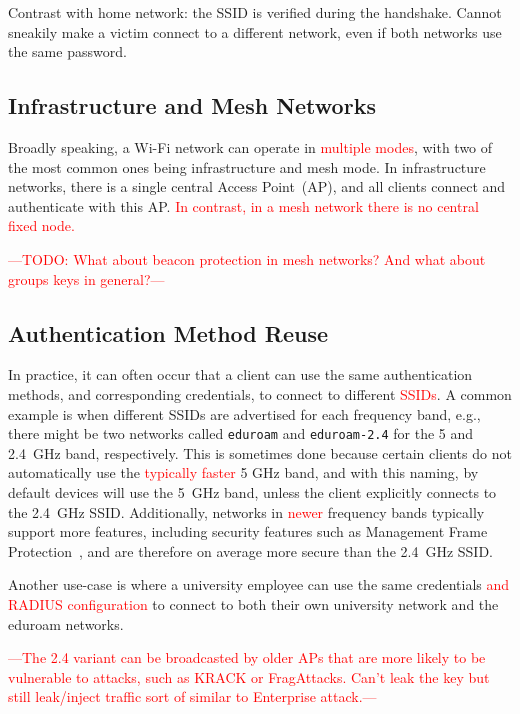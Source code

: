 \documentclass[sigconf,review]{acmart}
\newcommand{\wifi}{\mbox{Wi-Fi}}
\DeclareRobustCommand{\red}[1]{\textcolor{red}{#1}}
\begin{document}
Contrast with home network: the SSID is verified during the handshake.
Cannot sneakily make a victim connect to a different network, even if both networks use the same password.

\subsection{Infrastructure and Mesh Networks}

Broadly speaking, a \wifi{} network can operate in \red{multiple modes}, with two of the most common ones being infrastructure and mesh mode.
In infrastructure networks, there is a single central Access Point~(AP), and all clients connect and authenticate with this AP.
\red{In contrast, in a mesh network there is no central fixed node.}

\red{---TODO: What about beacon protection in mesh networks? And what about groups keys in general?---}

\subsection{Authentication Method Reuse}

In practice, it can often occur that a client can use the same authentication methods, and corresponding credentials, to connect to different \red{SSIDs}.
A common example is when different SSIDs are advertised for each frequency band, e.g., there might be two networks called \verb|eduroam| and \verb|eduroam-2.4| for the 5 and 2.4~GHz band, respectively.
This is sometimes done because certain clients do not automatically use the \red{typically faster} 5 GHz band, and with this naming, by default devices will use the 5~GHz band, unless the client explicitly connects to the 2.4~GHz SSID.
Additionally, networks in \red{newer} frequency bands typically support more features, including security features such as Management Frame Protection~\cite{schepers2021let}, and are therefore on average more secure than the 2.4~GHz SSID.

Another use-case is where a university employee can use the same credentials \red{and RADIUS configuration} to connect to both their own university network and the eduroam networks.

\red{---The 2.4 variant can be broadcasted by older APs that are more likely to be vulnerable to attacks, such as KRACK or FragAttacks. Can't leak the key but still leak/inject traffic sort of similar to Enterprise attack.---}
\end{document}
